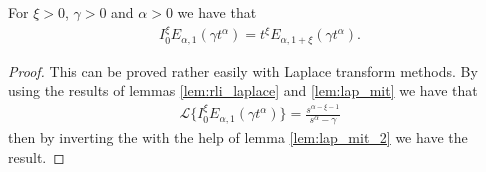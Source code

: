 \begin{mdframed}[innertopmargin=10pt]
\begin{lemma}
\label{lem-rli-mit-lef-1}
For $ \xi > 0 $, $ \gamma > 0 $ and $ \alpha > 0 $ we have that
	\begin{align}
		{I}^\xi_0 E_{\alpha,1}(\gamma t^\alpha) = t^\xi E_{\alpha,1+\xi}(\gamma t^\alpha).
	\end{align}
\end{lemma}
\end{mdframed}
\begin{proof}
	This can be proved rather easily with Laplace transform methods.
	By using the results of lemmas \ref{lem:rli_laplace} and \ref{lem:lap_mit} we have that
	\begin{align}
	    \mathcal{L}\{ I_0^\xi E_{\alpha, 1}(\gamma t^\alpha) \} = \frac{s^{\alpha-\xi-1}}{s^\alpha - \gamma}
	\end{align}
	then by inverting the with the help of lemma \ref{lem:lap_mit_2} we have the result.
\end{proof}

